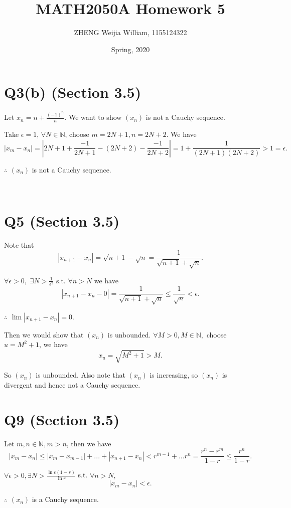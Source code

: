 \documentclass[12pt]{article}%
\begin{document}
\title{MATH2050A Homework 5}
\author{ZHENG Weijia William, 1155124322}
\date{Spring, 2020}
\maketitle

\section{Q3(b) (Section 3.5)}
Let $x_n = n+\frac{(-1)^n}{n}.$ We want to show $(x_n)$ is not a Cauchy sequence.

Take $\epsilon=1$, $\forall N\in \mathbb{N}$, choose $m = 2N+1, n=2N+2.$ We have $$|x_m-x_n|=|2N+1+\frac{-1}{2N+1}-(2N+2)-\frac{-1}{2N+2}|=1+\frac{1}{(2N+1)(2N+2)}>1=\epsilon.$$

$\therefore$ $(x_n)$ is not a Cauchy sequence. 

~\

\section{Q5 (Section 3.5)}
Note that $$|x_{n+1}-x_n|=\sqrt{n+1}-\sqrt{n}=\frac{1}{\sqrt{n+1}+\sqrt{n}}.$$

$\forall \epsilon>0,$ $\exists N>\frac{1}{\epsilon^2}$ s.t. $\forall n>N$ we have $$|x_{n+1}-x_n-0|=\frac{1}{\sqrt{n+1}+\sqrt{n}}\leq \frac{1}{\sqrt{n}}<\epsilon.$$

$\therefore$ $\lim |x_{n+1}-x_n|=0.$

Then we would show that $(x_n)$ is unbounded. $\forall M>0, M\in \mathbb{N},$ choose $u=M^2+1$, we have $$x_u = \sqrt{M^2+1}>M.$$

So $(x_n)$ is unbounded. Also note that $(x_n)$ is increasing, so $(x_n)$ is divergent and hence not a Cauchy sequence.


\section{Q9 (Section 3.5)}
Let $m,n \in \mathbb{N}, m>n$, then we have $$|x_m-x_n|\leq|x_m-x_{m-1}|+...+|x_{n+1}-x_n|<r^{m-1}+...r^{n}=\frac{r^n-r^m}{1-r}\leq \frac{r^n}{1-r}.$$

$\forall \epsilon>0, \exists N>\frac{\ln{\epsilon(1-r)}}{\ln{r}}$ s.t. $\forall n>N,$ $$|x_m-x_n|<\epsilon.$$

$\therefore$ $(x_n)$ is a Cauchy sequence.
\end{document}
